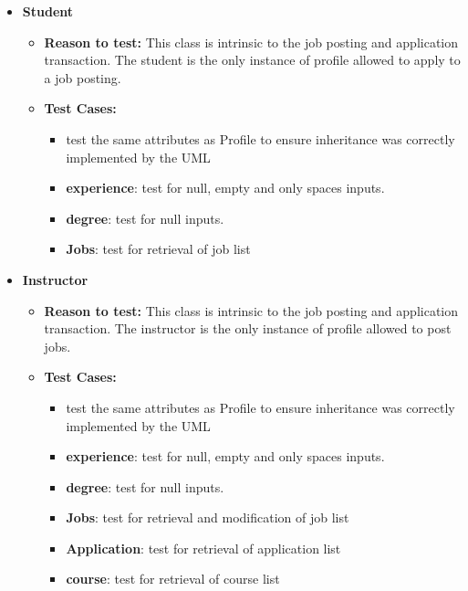 \documentclass[12pt]{report}
\begin{document}
\begin{itemize}
        \item \textbf{Student}
        \begin{itemize}
            \item \textbf{Reason to test:} This class is intrinsic to the job posting and application transaction. The student is the only instance of profile allowed to apply to a job posting.
            \item \textbf{Test Cases:} 
            \begin{itemize}
                \item test the same attributes as Profile to ensure inheritance was correctly implemented by the UML
                \item \textbf{experience}: test for null, empty and only spaces inputs.
                \item \textbf{degree}: test for null inputs.
                \item \textbf{Jobs}: test for retrieval of job list
            \end{itemize}
        \end{itemize}
        
        \item \textbf{Instructor}
        \begin{itemize}
            \item \textbf{Reason to test:} This class is intrinsic to the job posting and application transaction. The instructor is the only instance of profile allowed to post jobs.
            \item \textbf{Test Cases:} 
            \begin{itemize}
                \item test the same attributes as Profile to ensure inheritance was correctly implemented by the UML
                \item \textbf{experience}: test for null, empty and only spaces inputs.
                \item \textbf{degree}: test for null inputs.
                \item \textbf{Jobs}: test for retrieval and modification of job list
                \item \textbf{Application}: test for retrieval of application list
                \item \textbf{course}: test for retrieval of course list
            \end{itemize}
        \end{itemize}
        

\end{itemize}
\end{document}

